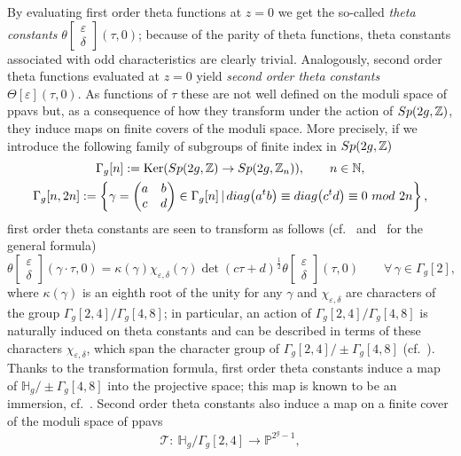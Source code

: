 \documentclass[11pt]{article}
\numberwithin{equation}{section}
\numberwithin{equation}{section}
\newcommand{\de}{\delta}
\newcommand{\ep}{\varepsilon}
\newcommand{\HH}{{\mathbb{H}}}
\newcommand{\PP}{{\mathbb{P}}}
\newcommand{\ZZ}{{\mathbb{Z}}}
\newcommand{\NN}{{\mathbb{N}}}
\def\ZZ{{\mathbb Z}}
\def\t{\theta}
\def\T{\Theta}
\def\tt#1#2{{\t\left[\begin{matrix}{#1}\\ {#2}\end{matrix}\right]}}
\begin{document}
By evaluating first order theta functions at $z=0$ we get the so-called {\it theta constants} $\theta\left[\begin{smallmatrix}\ep \\ \de \end{smallmatrix}\right] (\tau,0)$; because of the parity of theta functions, theta constants associated with odd characteristics are clearly trivial. Analogously, second order theta functions evaluated at $z=0$ yield {\it second order theta constants} $\T[\ep](\tau,0)$. As functions of $\tau$ these are not well defined on the moduli space of ppavs but, as a consequence of how they transform under the action of ${\rm Sp}(2g, \ZZ)$, they induce maps on finite covers of the moduli space. More precisely, if we introduce the following family of subgroups of finite index in ${\rm Sp}(2g, \ZZ)$
\begin{gather*}
\Gamma_g[n]:= \operatorname{Ker}({\rm Sp}(2g,\ZZ) \to {\rm Sp}(2g,\ZZ_n)), \qquad n \in \NN,\\
\Gamma_g[n,2n]:=\left\lbrace\gamma = \begin{pmatrix} a & b \\ c & d \end{pmatrix} \in \Gamma_g[n] \,|\, {\rm diag}\big(a^tb\big)\equiv{\rm diag}
\big(c^td\big)\equiv0\ {\rm mod}\ 2n \right\rbrace,
\end{gather*}
first order theta constants are seen to transform as follows (cf.~\cite{Ig72} and~\cite{RF} for the general formula)
\[
\tt\ep\de(\gamma \cdot \tau,0) = \kappa(\gamma) \chi_{\ep,\de}(\gamma) \det{(c \tau + d)}^{\frac{1}{2}} \tt\ep\de(\tau,0) \qquad \forall\, \gamma \in \Gamma_g[2],
\]
where $\kappa(\gamma)$ is an eighth root of the unity for any $\gamma$ and $ \chi_{\ep,\de}$ are characters of the group $\Gamma_g[2,4]/\Gamma_g[4,8]$; in particular, an action of $\Gamma_g[2,4]/\Gamma_g[4,8]$ is naturally induced on theta constants and can be described in terms of these characters $ \chi_{\ep,\de}$, which span the character group of $\Gamma_g[2,4]/\pm\Gamma_g[4,8]$ (cf.~\cite{SM}). Thanks to the transformation formula, first order theta constants induce a map of $\HH_g/\pm\Gamma_g[4,8]$ into the projective space; this map is known to be an immersion, cf.~\cite{Ig72}. Second order theta constants also induce a map on a finite cover of the moduli space of ppavs
\[
\mathcal{T}\colon \ \HH_g /\Gamma_g[2,4] \to \PP^{2^g-1},
\]
\end{document}
